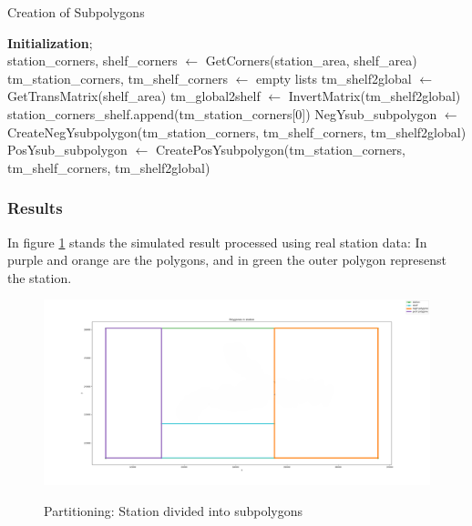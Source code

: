 \noindent

\begin{algorithm}[H]
\caption{Creation of Subpolygons}\label{alg:createSubpolygons}
\BlankLine
\textbf{Initialization}; \\
station\_corners, shelf\_corners $\gets$ GetCorners(station\_area, shelf\_area)\;
tm\_station\_corners, tm\_shelf\_corners $\gets$ empty lists\;
tm\_shelf2global $\gets$ GetTransMatrix(shelf\_area)\;
tm\_global2shelf $\gets$ InvertMatrix(tm\_shelf2global)\;
station\_corners\_shelf.append(tm\_station\_corners[0])\;
NegYsub\_subpolygon $\gets$ CreateNegYsubpolygon(tm\_station\_corners, tm\_shelf\_corners, tm\_shelf2global)\;
PosYsub\_subpolygon $\gets$ CreatePosYsubpolygon(tm\_station\_corners, tm\_shelf\_corners, tm\_shelf2global)\;
\;
\end{algorithm}
\noindent



\subsubsection{Results}

In figure \ref{Station polygon} stands the simulated result processed using real station data: In purple and orange are 
the polygons, and in green the outer polygon represenst the station.

\begin{figure}[H]
    \begin{center}
        \includegraphics[width=5in]{images/Chap2/Polygons_created.png}\\
        \caption{Partitioning: Station divided into subpolygons}
        \label{Station polygon}
        \end{center}    
\end{figure}

